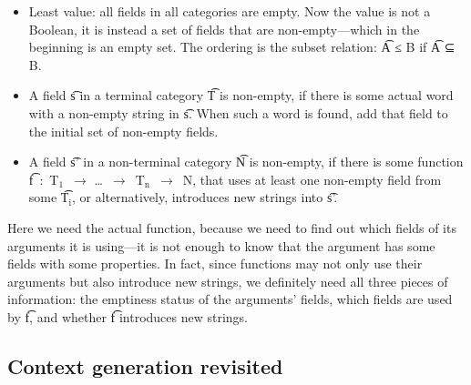\begin{itemize}
\setlength\itemsep{0em}
\item Least value: all fields in all categories are empty. Now
  the value is not a Boolean, it is instead a set of fields that are
  non-empty---which in the beginning is an empty set. The ordering
  is the subset relation: \t{A ≤ B} if \t{A ⊆ B}.
\item A field \t{s} in a terminal category \t{T} is non-empty, if
  there is some actual word with a non-empty string in \t{s}. When
  such a word is found, add that field to the initial set of non-empty
  fields.
\item A field \t{s'} in a non-terminal category \t{N} is non-empty, if
  there is some function \t{f~:~T$_\text{1}$~$\rightarrow$
    \dots~$\rightarrow$~T$_\text{n}$~$\rightarrow$~N}, that uses at
  least one non-empty field from some \t{T$_\text{i}$}, or
  alternatively, introduces new strings into \t{s'}.
\end{itemize}

\noindent Here we need the actual \gf{} function, because we need to
find out which fields of its arguments it is using---it is not enough
to know that the argument has some fields with some properties. In
fact, since functions may not only use their arguments but also
introduce new strings, we definitely need all three pieces of
information: the emptiness status of the arguments’ fields, which
fields are used by \t{f}, and whether \t{f} introduces new strings.

\subsection{Context generation revisited}



